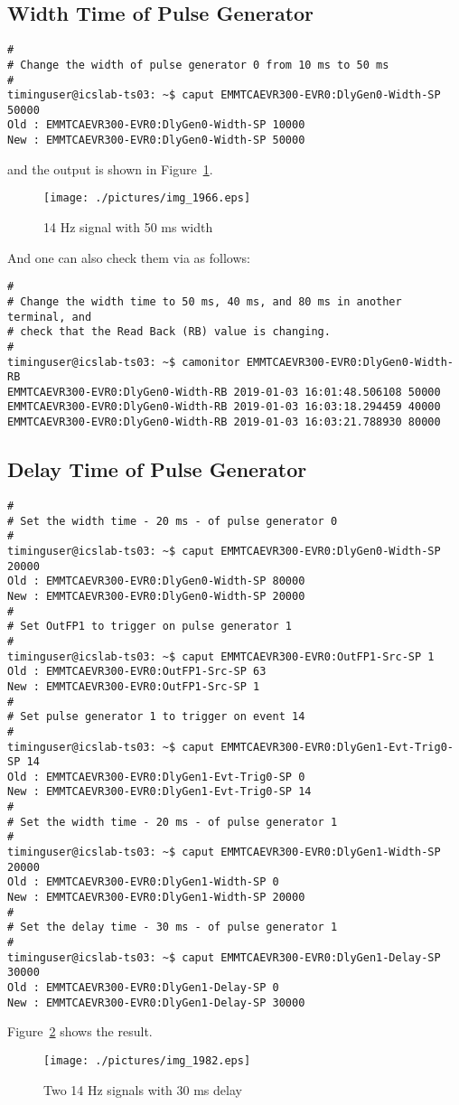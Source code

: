 \documentclass[11pt
  , a4paper
  , article
  , oneside
  , showtrims
]{memoir}
\begin{document}
{\subsection{Width Time of Pulse Generator}
\begin{lstlisting}[style=termstyle]
#
# Change the width of pulse generator 0 from 10 ms to 50 ms
#
timinguser@icslab-ts03: ~$ caput EMMTCAEVR300-EVR0:DlyGen0-Width-SP 50000
Old : EMMTCAEVR300-EVR0:DlyGen0-Width-SP 10000
New : EMMTCAEVR300-EVR0:DlyGen0-Width-SP 50000
\end{lstlisting}
and the output is shown in Figure~\ref{fig:50ms}.
\begin{figure}[!ht]
  \centering
    \texttt{[image: ./pictures/img\_1966.eps]}
  \caption{14 Hz signal with 50 ms width}
  \label{fig:50ms}
\end{figure}

And one can also check them via  as follows:
\begin{lstlisting}[style=termstyle]
#
# Change the width time to 50 ms, 40 ms, and 80 ms in another terminal, and
# check that the Read Back (RB) value is changing.
#
timinguser@icslab-ts03: ~$ camonitor EMMTCAEVR300-EVR0:DlyGen0-Width-RB
EMMTCAEVR300-EVR0:DlyGen0-Width-RB 2019-01-03 16:01:48.506108 50000
EMMTCAEVR300-EVR0:DlyGen0-Width-RB 2019-01-03 16:03:18.294459 40000
EMMTCAEVR300-EVR0:DlyGen0-Width-RB 2019-01-03 16:03:21.788930 80000
\end{lstlisting}

\subsection{Delay Time of Pulse Generator}
\begin{lstlisting}[style=termstyle]
#
# Set the width time - 20 ms - of pulse generator 0
#
timinguser@icslab-ts03: ~$ caput EMMTCAEVR300-EVR0:DlyGen0-Width-SP 20000
Old : EMMTCAEVR300-EVR0:DlyGen0-Width-SP 80000
New : EMMTCAEVR300-EVR0:DlyGen0-Width-SP 20000
#
# Set OutFP1 to trigger on pulse generator 1
#
timinguser@icslab-ts03: ~$ caput EMMTCAEVR300-EVR0:OutFP1-Src-SP 1
Old : EMMTCAEVR300-EVR0:OutFP1-Src-SP 63
New : EMMTCAEVR300-EVR0:OutFP1-Src-SP 1
#
# Set pulse generator 1 to trigger on event 14
#
timinguser@icslab-ts03: ~$ caput EMMTCAEVR300-EVR0:DlyGen1-Evt-Trig0-SP 14
Old : EMMTCAEVR300-EVR0:DlyGen1-Evt-Trig0-SP 0
New : EMMTCAEVR300-EVR0:DlyGen1-Evt-Trig0-SP 14
#
# Set the width time - 20 ms - of pulse generator 1
#
timinguser@icslab-ts03: ~$ caput EMMTCAEVR300-EVR0:DlyGen1-Width-SP 20000
Old : EMMTCAEVR300-EVR0:DlyGen1-Width-SP 0
New : EMMTCAEVR300-EVR0:DlyGen1-Width-SP 20000
#
# Set the delay time - 30 ms - of pulse generator 1
#
timinguser@icslab-ts03: ~$ caput EMMTCAEVR300-EVR0:DlyGen1-Delay-SP 30000
Old : EMMTCAEVR300-EVR0:DlyGen1-Delay-SP 0
New : EMMTCAEVR300-EVR0:DlyGen1-Delay-SP 30000
\end{lstlisting}
Figure~\ref{fig:delay} shows the result.
\begin{figure}[!htb]
  \centering
    \texttt{[image: ./pictures/img\_1982.eps]}
  \caption{Two 14 Hz signals with 30 ms delay}
  \label{fig:delay}
\end{figure}

}
\end{document}
